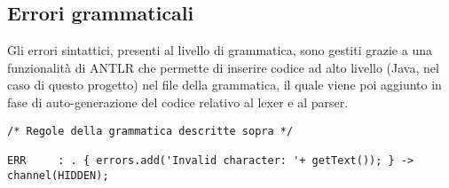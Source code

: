 \documentclass[../../main]{subfiles}
\begin{document}
\subsection{Errori grammaticali}
Gli errori sintattici, presenti al livello di grammatica, sono gestiti grazie a una funzionalità di ANTLR che permette
di inserire codice ad alto livello (Java, nel caso di questo progetto) nel file della grammatica, il quale viene poi aggiunto 
in fase di auto-generazione del codice relativo al lexer e al parser.
\begin{lstlisting}[style=antlr]
/* Regole della grammatica descritte sopra */

ERR     : . { errors.add('Invalid character: '+ getText()); } -> channel(HIDDEN);
\end{lstlisting}
\end{document}
